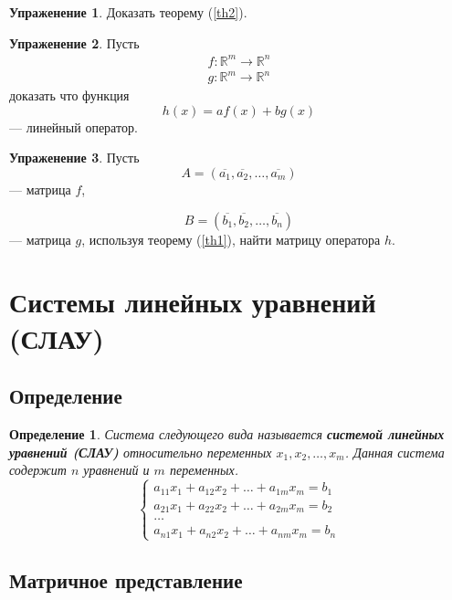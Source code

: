 \documentclass[]{article}
\theoremstyle{theorem}
\newtheorem{dfn}{Определение}
\theoremstyle{definition}
\newtheorem{tk}{Упраженение}
\begin{document}
\begin{tk}
	Доказать теорему (\ref{th2}).
\end{tk}

\begin{tk}
	Пусть \begin{gather*}
	f:\mathbb{R}^m\rightarrow\mathbb{R}^n
	\\
	g:\mathbb{R}^m\rightarrow\mathbb{R}^n
\end{gather*}
доказать что функция 
\begin{equation*}
	h(x)=af(x)+bg(x)
\end{equation*} --- линейный оператор. 
\end{tk}

\begin{tk}
	Пусть 
\begin{equation*}
	A=(\overline{a_1},\overline{a_2},\ldots,\overline{a_m})
\end{equation*} --- матрица $f$, 

\begin{equation*}
	B=(\overline{b_1},\overline{b_2},\ldots,\overline{b_n})
\end{equation*} --- матрица $g$, используя теорему (\ref{th1}), найти матрицу оператора $h$.
\end{tk}

\section{Системы линейных уравнений (СЛАУ)}
\subsection{Определение}
\begin{dfn}
Система следующего вида называется \textbf{системой линейных уравнений (СЛАУ)} относительно переменных $x_1,x_2,\ldots,x_m$. Данная система содержит $n$ уравнений и $m$ переменных.
\begin{equation*}
\begin{cases}
	a_{11}x_1 + a_{12}x_2 + \ldots + a_{1m}x_m=b_1
	\\
	a_{21}x_1 + a_{22}x_2 + \ldots + a_{2m}x_m=b_2
	\\
	\ldots
	\\
	a_{n1}x_1 + a_{n2}x_2 + \ldots + a_{nm}x_m=b_n
\end{cases}
\end{equation*}
\end{dfn}
\subsection{Матричное представление}
\end{document}
